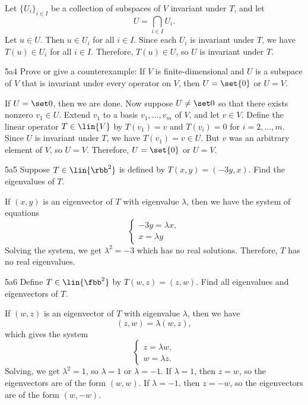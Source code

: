 \begin{sol}
    Let $\{U_i\}_{i \in I}$ be a collection of subspaces of $V$ invariant under $T$, and let
    \[
    	U = \bigcap_{i \in I} U_i.
    \]
    Let $u \in U$.
	Then $u \in U_i$ for all $i \in I$.
	Since each $U_i$ is invariant under $T$, we have $T(u) \in U_i$ for all $i \in I$.
	Therefore, $T(u) \in U$, so $U$ is invariant under $T$.
\end{sol}

\begin{exercise}{5a4}
    Prove or give a counterexample: If $V$ is finite-dimensional and $U$ is a subspace of $V$ that is invariant under every operator on $V$, then $U = \set{0}$ or $U = V$.
\end{exercise}

\begin{sol}
    If $U = \set 0$, then we are done.
	Now suppose $U \neq \set 0$ so that there exists nonzero $v_1 \in U$.
	Extend $v_1$ to a basis $v_1, \ldots, v_m$ of $V$, and let $v \in V$.
	Define the linear operator $T \in \lin{V}$ by $T(v_1) = v$ and $T(v_i) = 0$ for $i = 2, \ldots, m$.
	Since $U$ is invariant under $T$, we have $T(v_1) = v \in U$.
	But $v$ was an arbitrary element of $V$, so $U = V$.
	Therefore, $U = \set{0}$ or $U = V$.
\end{sol}

\begin{exercise}{5a5}
    Suppose $T \in \lin{\rbb^2}$ is defined by $T(x, y) = (-3y, x)$.
	Find the eigenvalues of $T$.
\end{exercise}

\begin{sol}
    If $(x, y)$ is an eigenvector of $T$ with eigenvalue $\lambda$, then we have the system of equations
    \[
        \begin{cases}
            -3y = \lambda x,\\
            x = \lambda y
        \end{cases}
    \]
    Solving the system, we get $\lambda^2 = -3$ which has no real solutions.
	Therefore, $T$ has no real eigenvalues.
\end{sol}

\begin{exercise}{5a6}
    Define $T \in \lin{\fbb^2}$ by $T(w, z) = (z, w)$.
	Find all eigenvalues and eigenvectors of $T$.
\end{exercise}

\begin{sol}
    If $(w, z)$ is an eigenvector of $T$ with eigenvalue $\lambda$, then we have
    \[
        (z, w) = \lambda (w, z),
    \]
    which gives the system
    \[
        \begin{cases}
            z = \lambda w,\\
            w = \lambda z.
        \end{cases}
    \]
    Solving, we get $\lambda^2 = 1$, so $\lambda = 1$ or $\lambda = -1$.
	If $\lambda = 1$, then $z = w$, so the eigenvectors are of the form $(w, w)$.
	If $\lambda = -1$, then $z = -w$, so the eigenvectors are of the form $(w, -w)$.
\end{sol}

